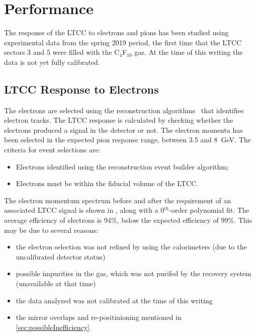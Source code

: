 \section{Performance}

The response of the LTCC to electrons and pions has been studied using experimental data from the spring 2019 period,
the first time that the LTCC sectors 3 and 5 were filled with the C$_4$F$_{10}$ gas.
At the time of this writing the data is not yet fully calibrated.

\subsection{LTCC Response to Electrons}\label{sec:elecResponse}

The electrons are selected using the reconstruction algorithms~\cite{recon-nim} that identifies electron tracks.
The LTCC response is calculated by checking whether the electrons produced a signal in the detector or not.
The electron momenta has been selected in the expected pion response range, between 3.5 and 8~GeV.
The criteria for event selections are:

\begin{itemize}
   \item  Electrons identified using the reconstruction event builder algorithm;
    \item Electrons must be within the fiducial volume of the LTCC.
\end{itemize}


The electron momentum spectrum before and after the requirement of an associated LTCC signal is shown
in , along with a 0$^{th}$-order polynomial fit. The average efficiency of electrons is
94$\%$, below the expected efficiency of 99$\%$. This may be due to several reasons:

\begin{itemize}
\item the electron selection was not refined by using the calorimeters (due to the uncalibrated detector status)
\item possible impurities in the gas, which was not purifed by the recovery system (unavailable at that time)
\item the data analyzed was not calibrated at the time of this writing
\item the mirror overlaps and re-positinioning mentioned in \ref{sec:possibleInefficiency}.
\end{itemize}

